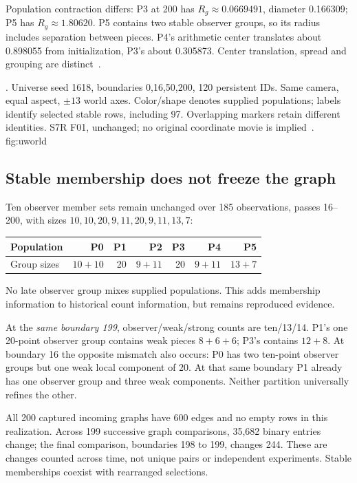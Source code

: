 Population contraction differs: P3 at 200 has \(R_g\approx0.0669491\), diameter 0.166309; P5 has \(R_g\approx1.80620\). P5 contains two stable observer groups, so its radius includes separation between pieces. P4's arithmetic center translates about 0.898055 from initialization, P3's about 0.305873. Center translation, spread and grouping are distinct~\citep{s7rmotion,s7rreview}.

{. Universe seed 1618, boundaries 0,16,50,200, 120 persistent IDs. Same camera, equal aspect, \(\pm13\) world axes. Color/shape denotes supplied populations; labels identify selected stable rows, including 97. Overlapping markers retain different identities. S7R F01, unchanged; no original coordinate movie is implied~\citep{s7rmotion}.}
{fig:uworld}

\subsection{Stable membership does not freeze the graph}
Ten observer member sets remain unchanged over 185 observations, passes 16--200, with sizes \(10,10,20,9,11,20,9,11,13,7\):
\begin{center}\small
\begin{tabular}{lrrrrrr}\toprule
Population & P0 & P1 & P2 & P3 & P4 & P5\\\midrule
Group sizes & \(10+10\) & 20 & \(9+11\) & 20 & \(9+11\) & \(13+7\)\\
\bottomrule\end{tabular}
\end{center}
No late observer group mixes supplied populations. This adds membership information to historical count information, but remains reproduced evidence.

At the \emph{same boundary 199}, observer/weak/strong counts are ten/13/14. P1's one 20-point observer group contains weak pieces \(8+6+6\); P3's contains \(12+8\). At boundary 16 the opposite mismatch also occurs: P0 has two ten-point observer groups but one weak local component of 20. At that same boundary P1 already has one observer group and three weak components. Neither partition universally refines the other.

All 200 captured incoming graphs have 600 edges and no empty rows in this realization. Across 199 successive graph comparisons, 35,682 binary entries change; the final comparison, boundaries 198 to 199, changes 244. These are changes counted across time, not unique pairs or independent experiments. Stable memberships coexist with rearranged selections.

